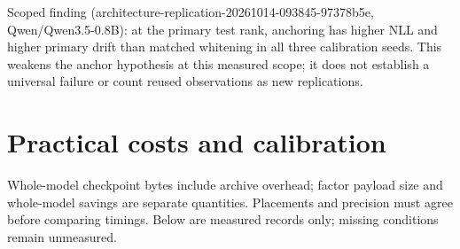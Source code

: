 \documentclass[10pt]{article}
\begin{document}
Scoped finding (architecture-replication-20261014-093845-97378b5e, Qwen/Qwen3.5-0.8B): at the primary test rank, anchoring has higher NLL and higher primary drift than matched whitening in all three calibration seeds. This weakens the anchor hypothesis at this measured scope; it does not establish a universal failure or count reused observations as new replications.

\section{Practical costs and calibration}

Whole-model checkpoint bytes include archive overhead; factor payload size and whole-model savings are separate quantities. Placements and precision must agree before comparing timings. Below are measured records only; missing conditions remain unmeasured.
\end{document}
